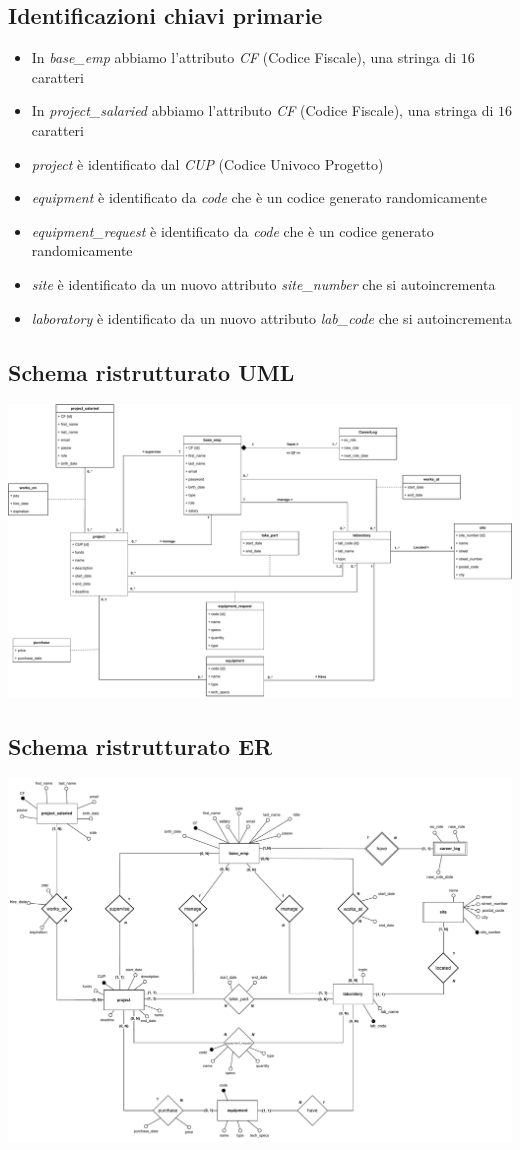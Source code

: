\subsection{Identificazioni chiavi primarie}
\begin{itemize}
	\item In \textit{base\_emp} abbiamo l'attributo \textit{CF} (Codice Fiscale), una stringa di $16$ caratteri
	\item In \textit{project\_salaried} abbiamo l'attributo \textit{CF} (Codice Fiscale), una stringa di $16$ caratteri
	\item \textit{project} è identificato dal \textit{CUP} (Codice Univoco Progetto)
	\item \textit{equipment} è identificato da \textit{code} che è un codice generato randomicamente
	\item \textit{equipment\_request} è identificato da \textit{code} che è un codice generato randomicamente
	\item \textit{site} è identificato da un nuovo attributo \textit{site\_number} che si autoincrementa
	\item \textit{laboratory} è identificato da un nuovo attributo \textit{lab\_code} che si autoincrementa
\end{itemize}
\newpage

\subsection{Schema ristrutturato UML}
\bigskip \includegraphics[width=\textwidth]{images/Ristrutturato-UML.drawio.pdf}


\subsection{Schema ristrutturato ER}
\bigskip \includegraphics[width=\textwidth]{images/Ristrutturato-ER.drawio.pdf}



